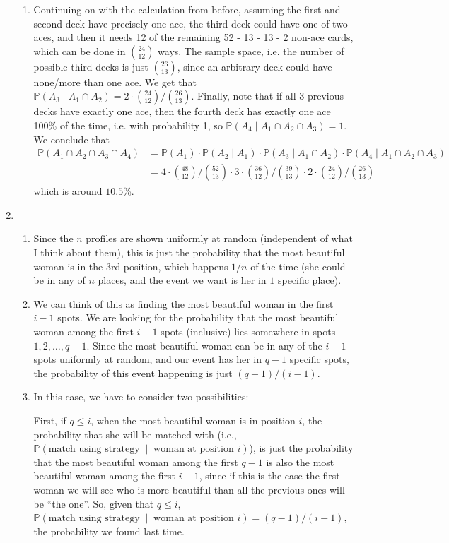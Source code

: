 \documentclass[12pt]{article}
\theoremstyle{definition}
\theoremstyle{remark}
\renewcommand{\P}{\mathbb{P}}
\begin{document}
\begin{enumerate}[leftmargin=\labelsep]
\begin{enumerate}
			\item Continuing on with the calculation from before, assuming the first and second deck have precisely one ace, the third deck could have one of two aces, and then it needs 12 of the remaining 52 - 13 - 13 - 2 non-ace cards, which can be done in ${24 \choose 12}$ ways. The sample space, i.e. the number of possible third decks is just ${26 \choose 13}$, since an arbitrary deck could have none/more than one ace. We get that $\P(A_3 \mid A_1 \cap A_2) = 2 \cdot {24 \choose 12} / {26 \choose 13}$. Finally, note that if all 3 previous decks have exactly one ace, then the fourth deck has exactly one ace 100\% of the time, i.e. with probability 1, so $\P(A_4 \mid A_1 \cap A_2 \cap A_3) = 1$. We conclude that
			\begin{align*}
				\P(A_1 \cap A_2 \cap A_3 \cap A_4) &= \P(A_1) \cdot \P(A_2 \mid A_1) \cdot \P(A_3 \mid A_1 \cap A_2) \cdot \P(A_4 \mid A_1 \cap A_2 \cap A_3) \\
				&= 4 \cdot {48 \choose 12} / {52 \choose 13} \cdot 3 \cdot {36 \choose 12} / {39 \choose 13} \cdot 2 \cdot {24 \choose 12} / {26 \choose 13}
			\end{align*}
			which is around $10.5$\%.
		\end{enumerate}
		
		\newpage
		\item 
		\begin{enumerate}
			\item Since the $n$ profiles are shown uniformly at random (independent of what I think about them), this is just the probability that the most beautiful woman is in the $3$rd position, which happens $1/n$ of the time (she could be in any of $n$ places, and the event we want is her in $1$ specific place).
			
			\item We can think of this as finding the most beautiful woman in the first $i-1$ spots. We are looking for the probability that the most beautiful woman among the first $i-1$ spots (inclusive) lies somewhere in spots $1, 2, \ldots, q-1$. Since the most beautiful woman can be in any of the $i-1$ spots uniformly at random, and our event has her in $q-1$ specific spots, the probability of this event happening is just $(q-1)/(i-1)$. 
			
			\item In this case, we have to consider two possibilities: 
			
			First, if $q \leq i$, when the most beautiful woman is in position $i$, the probability that she will be matched with (i.e., $\P(\text{match using strategy} \;\mid\; \text{woman at position $i$})$), is just the probability that the most beautiful woman among the first $q-1$ is also the most beautiful woman among the first $i-1$, since if this is the case the first woman we will see who is more beautiful than all the previous ones will be ``the one''. So, given that $q \leq i$, $\P(\text{match using strategy} \;\mid\; \text{woman at position $i$}) = (q-1)/(i-1)$, the probability we found last time. 
			

\end{enumerate}
\end{enumerate}
\end{document}
